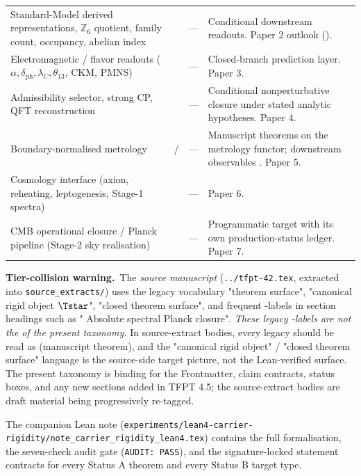 \begin{center}
\begin{tabularx}{\textwidth}{@{}p{}p{}p{}Y@{}}
Standard-Model derived representations,
  $\mathbb Z_6$ quotient, family count, occupancy, abelian index
  & 
  & ---
  & Conditional downstream readouts. Paper 2  outlook (). \\
Electromagnetic / flavor readouts
  ($\alpha,\delta_{\mathrm{ph}},\lambda_C,\theta_{13}$, CKM, PMNS)
  & 
  & ---
  & Closed-branch prediction layer. Paper 3. \\
Admissibility selector, strong CP, QFT reconstruction
  & 
  & ---
  & Conditional nonperturbative closure under stated analytic hypotheses. Paper 4. \\
Boundary-normalised metrology
  & /
  & ---
  & Manuscript theorems on the metrology functor; downstream observables . Paper 5. \\
Cosmology interface (axion, reheating, leptogenesis, Stage-1 spectra)
  & 
  & ---
  & Paper 6. \\
CMB operational closure / Planck pipeline (Stage-2 sky realisation)
  & 
  & ---
  & Programmatic target with its own production-status ledger. Paper 7. \\
\bottomrule
\end{tabularx}
\end{center}

\medskip
\noindent
\textbf{Tier-collision warning.}\ The \emph{source manuscript}
(\texttt{../tfpt-42.tex}, extracted into \texttt{source\_extracts/})
uses the legacy vocabulary "theorem surface", "canonical rigid
object $\Tstar$", "closed theorem surface", and frequent
-labels in section headings such as
" Absolute spectral Planck closure". \emph{These legacy
-labels are not the  of the present taxonomy.}
In source-extract bodies, every legacy  should be read
as  (manuscript theorem), and the "canonical rigid
object" / "closed theorem surface" language is the source-side
target picture, not the Lean-verified surface. The present
taxonomy is binding for the Frontmatter, claim contracts,
status boxes, and any new sections added in TFPT 4.5; the
source-extract bodies are draft material being progressively
re-tagged.

\noindent
The companion Lean note
(\texttt{experiments/lean4-carrier-rigidity/note\_carrier\_rigidity\_lean4.tex})
contains the full formalisation, the seven-check audit gate
(\texttt{AUDIT:~PASS}), and the signature-locked statement
contracts for every Status A theorem and every Status B
target type.

